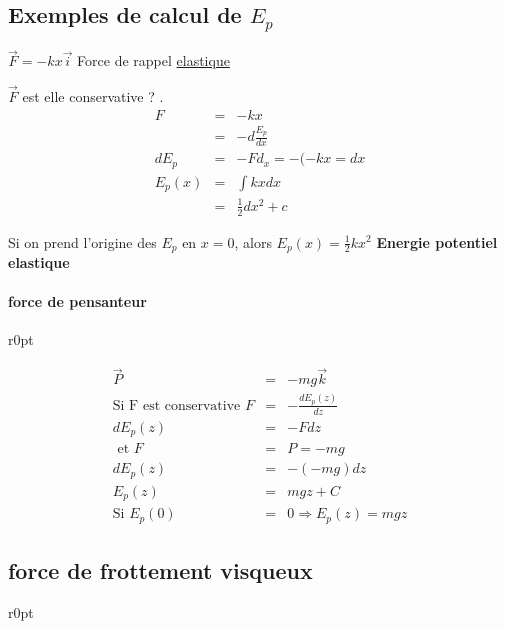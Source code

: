 \subsection{Exemples de calcul de $E_p$}

$\vec{F} =-kx\vec{i}$ Force de rappel \ul{elastique}

$\vec{F}$ est elle conservative ? .
\[\begin{array}{rcl}
F &=& -kx \\
&=& -d\frac{E_p}{dx} \\
dE_p &=& -Fd_x = -(-kx=dx \\
E_p(x) &=& \int kxdx \\
&=& \frac{1}{2}dx^2 + c\end{array}\]

Si on prend l'origine des $E_p$ en $x=0$, alors $E_p(x) = \frac{1}{2}kx^2$ \textbf{Energie potentiel elastique}

\paragraph{force de pensanteur}

\begin{wrapfigure}[6]{r}{0pt}
\end{wrapfigure}

\[\begin{array}{rcl}
\vec{P} &=& -mg\vec{k} \\
\text{Si F est conservative } F &=& -\frac{dE_p(z)}{dz} \\
dE_p(z) &=& -Fdz \\
\text{ et } F &=& P = -mg \\
dE_p(z) &=& -(-mg)dz \\
E_p(z) &=& mgz + C \\
\text{Si } E_p(0) &=& 0 \Rightarrow E_p(z) = mgz\end{array}\]

\subsection{force de frottement visqueux}

\begin{wrapfigure}[5]{r}{0pt}

\end{wrapfigure}

